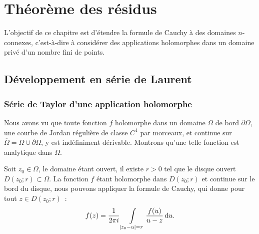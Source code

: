 \chapter{Théorème des résidus}
L'objectif de ce chapitre est d'étendre la formule de Cauchy à des domaines $n$-connexes, c'est-à-dire à considérer des applications holomorphes dans un domaine privé d'un nombre fini de points.
\section{Développement en série de Laurent}

\subsection{Série de Taylor d'une application holomorphe}

Nous avons vu que toute fonction $f$ holomorphe dans un domaine $\Omega$ de bord $\partial \Omega$, une courbe de Jordan régulière de classe $C^1$ par morceaux, et continue sur $\overline{\Omega}=\Omega \cup \partial \Omega$, y est indéfiniment dérivable. Montrons qu'une telle fonction est analytique dans $\Omega$.

Soit $z_0 \in \Omega$, le domaine étant ouvert, il existe $r>0$ tel que le disque ouvert $D(z_0 ;r) \subset \Omega$. La 
fonction $f$ étant holomorphe dans $D(z_0 ;r)$ et continue sur le bord du disque, nous pouvons appliquer la formule de Cauchy, qui donne pour tout $z \in D(z_0 ; r)$~:
\[f(z)=\frac{1}{2 \pi i}\int\limits_{\lvert z_0- u \rvert =r} \frac{f(u)}{u-z} \mathop{}\mathopen{}\mathrm{d} u.\]

